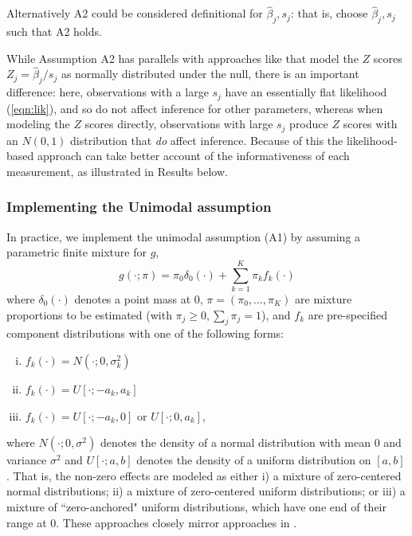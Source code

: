 \documentclass[10pt]{article}
\begin{document}
Alternatively A2 could be considered definitional for $\hat\beta_j,s_j$: that is, choose $\hat\beta_j,s_j$ such that A2 holds. 

While Assumption A2 has parallels with approaches like \cite{efron, cai?} that model the $Z$ scores $Z_j = \hat\beta_j/s_j$ as normally distributed under the null, 
there is an important difference: here, observations with a large $s_j$ have an essentially flat likelihood (\ref{eqn:lik}), and so do not affect inference for
other parameters, whereas when modeling the $Z$ scores directly, observations with large $s_j$ produce $Z$ scores with an $N(0,1)$ distribution that {\it do} affect inference. 
Because of this the likelihood-based approach can take better account of the informativeness of each measurement, as illustrated in Results below.


\subsubsection*{Implementing the Unimodal assumption}
 
In practice, we implement the unimodal assumption (A1) by assuming a parametric finite mixture for $g$, 
\begin{equation} \label{eqn:g}
g(\cdot; \pi) = \pi_0 \delta_0(\cdot) + \sum_{k=1}^K \pi_k f_k(\cdot) 
\end{equation}
where $\delta_0(\cdot)$ denotes a point mass at 0, $\pi=(\pi_0,\dots,\pi_K)$ are mixture proportions to be estimated (with $\pi_j \geq 0, \sum_j \pi_j=1$), and $f_k$ are pre-specified 
component distributions with one of the following forms: 
\begin{enumerate}[i)]
\item $f_k(\cdot) = N(\cdot; 0, \sigma^2_k)$
\item $f_k(\cdot) = U[\cdot; -a_k,a_k]$
\item $f_k(\cdot) = U[\cdot; -a_k,0] \text{ or } U[\cdot; 0,a_k]$,
\end{enumerate}
where $N(\cdot; 0,\sigma^2)$ denotes the density of a normal distribution with mean 0 and variance $\sigma^2$ and
$U[\cdot; a,b]$ denotes the density of a uniform distribution on $[a,b]$.
That is, the non-zero effects are modeled as either i) a mixture of zero-centered normal distributions; ii) a mixture of zero-centered uniform distributions;
or iii) a mixture of ``zero-anchored" uniform distributions, which have one end of their range at 0. These approaches closely mirror approaches in \cite{campy.thomas}.
 
\end{document}
